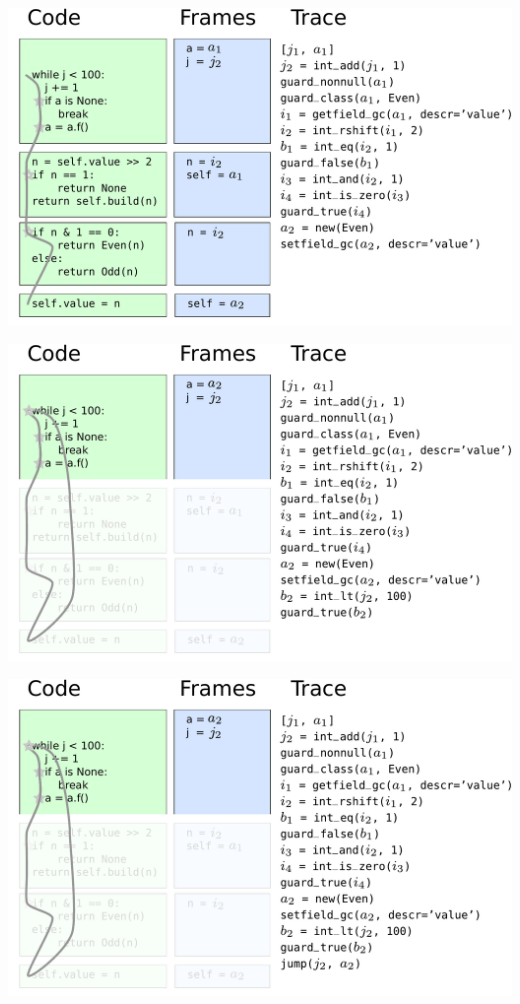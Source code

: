 \documentclass[utf8x]{beamer}
\begin{document}
\begin{frame}
  \includegraphics[scale=0.4]{figures/loop10}
\end{frame}

\begin{frame}
  \includegraphics[scale=0.4]{figures/loop11}
\end{frame}

\begin{frame}
  \includegraphics[scale=0.4]{figures/loop12}
\end{frame}
\end{document}
